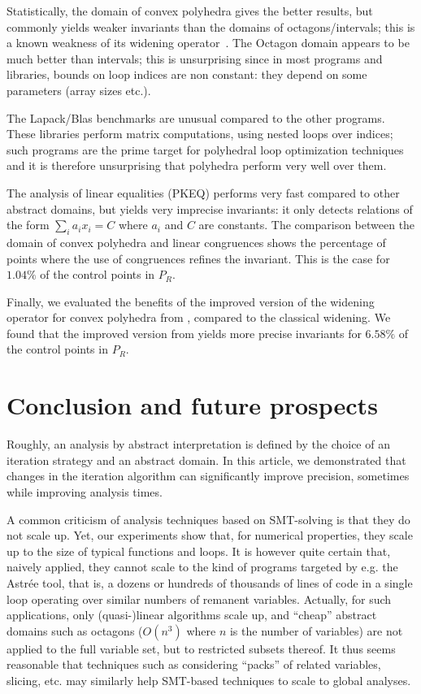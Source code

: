 \documentclass[preprint]{sigplanconf}
\begin{document}
Statistically, the domain of convex polyhedra gives the better results, but
commonly yields weaker invariants than the domains of octagons/intervals;
this is a known weakness of its widening operator~\cite{Monniaux_LeGuen2011}. 
The Octagon domain appears to be much better than intervals; this is
unsurprising since in most programs and libraries, bounds on loop indices are
non constant: they depend on some parameters (array sizes etc.).

The Lapack/Blas benchmarks are unusual compared to the other programs. These libraries perform matrix computations, using nested loops over indices; such programs are the prime target for polyhedral loop optimization techniques and it is therefore unsurprising that polyhedra perform very well over them.

The analysis of linear equalities (PKEQ) performs very fast compared
to other abstract domains, but yields very imprecise invariants:
it only detects relations of the form $\sum_i a_i x_i = C$ where $a_i$ and $C$ are constants.
The comparison between the domain of convex polyhedra and linear congruences
shows the percentage of points where the use of congruences refines the
invariant. This is the case for $1.04\%$ of the control points in $P_R$.

Finally, we evaluated the benefits of the improved version of the widening
operator for convex polyhedra from \citet{BagnaraHRZ05SCP}, compared to the
classical widening. We found that the improved version from
\citet{BagnaraHRZ05SCP} yields more precise invariants for $6.58\%$ of the
control points in $P_R$.

\section{Conclusion and future prospects}
Roughly, an analysis by abstract interpretation is defined by the choice of an iteration strategy and an abstract domain. In this article, we demonstrated that changes in the iteration algorithm can significantly improve precision, sometimes while improving analysis times.

A common criticism of analysis techniques based on SMT-solving is that they
do not scale up. Yet, our experiments show that, for numerical properties,
they scale up to the size of typical functions and loops.
It is however
quite certain that, naively applied, they cannot scale to the kind of
programs targeted by e.g. the Astr\'ee tool, that is, a dozens or hundreds
of thousands of lines of code in a single loop operating over similar numbers
of remanent variables.
Actually, for such applications, only (quasi-)linear
algorithms scale up, and ``cheap'' abstract domains such as octagons ($O(n^3)$ where $n$ is the number of variables) are not applied to the full variable set, but to restricted subsets thereof.
It thus seems reasonable that techniques such as considering ``packs'' of related variables, slicing, etc. may similarly help SMT-based techniques to scale to global analyses.
\end{document}
